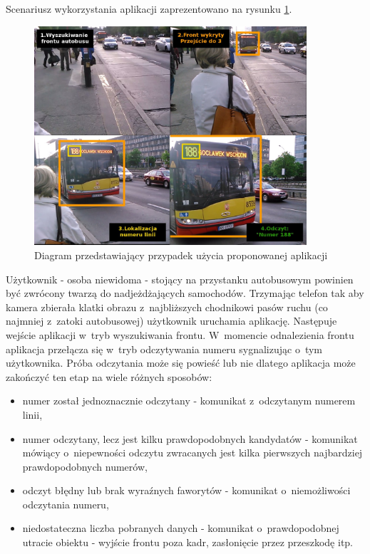 Scenariusz wykorzystania aplikacji zaprezentowano na rysunku
\ref{fig:int_use_case_diag}.

\begin{figure}[!h]
    \centering
    \includegraphics[width=0.9\textwidth]{img/int_use_case_sequence}
    \caption{Diagram przedstawiający przypadek użycia proponowanej aplikacji}
    \label{fig:int_use_case_diag}
\end{figure}

Użytkownik - osoba niewidoma - stojący na przystanku autobusowym powinien
być zwrócony twarzą do nadjeżdżających samochodów. Trzymając
telefon tak aby kamera zbierała klatki obrazu
z~najbliższych chodnikowi pasów ruchu (co najmniej z~zatoki autobusowej)
użytkownik uruchamia aplikację. Następuje wejście aplikacji w~tryb
wyszukiwania frontu. W~momencie odnalezienia frontu aplikacja
przełącza się w~tryb odczytywania numeru sygnalizując o~tym użytkownika.
Próba odczytania może się powieść lub nie dlatego aplikacja może
zakończyć ten etap na wiele różnych sposobów:

\begin{itemize}
	\item numer został jednoznacznie odczytany - komunikat z~odczytanym 
		numerem linii,
	\item numer odczytany, lecz jest kilku prawdopodobnych kandydatów - 
		komunikat mówiący o~niepewności odczytu zwracanych jest
		kilka pierwszych najbardziej prawdopodobnych numerów,
	\item odczyt błędny lub brak wyraźnych faworytów - komunikat
		o~niemożliwości odczytania numeru,
	\item niedostateczna liczba pobranych danych - komunikat 
		o~prawdopodobnej utracie obiektu - wyjście frontu
		poza kadr, zasłonięcie przez przeszkodę itp.
\end{itemize}

